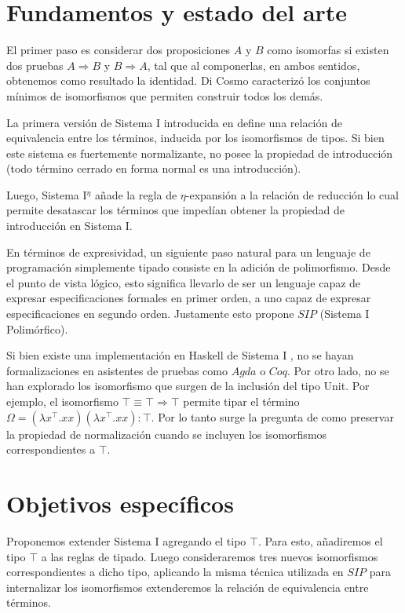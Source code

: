 \documentclass[a4paper,10pt]{article}
\begin{document}
\section{Fundamentos y estado del arte}

El primer paso es considerar dos proposiciones $A$ y $B$ como isomorfas si existen dos pruebas $A \Rightarrow B$ y $B \Rightarrow A$, tal que al componerlas, en ambos sentidos, obtenemos como resultado la identidad. Di Cosmo \cite{dicosmo} caracterizó los conjuntos mínimos de isomorfismos que permiten construir todos los demás.

La primera versión de Sistema I introducida en \cite{sistema-i} define una relación de equivalencia entre los términos, inducida por los isomorfismos de tipos. Si bien este sistema es fuertemente normalizante, no posee la propiedad de introducción (todo término cerrado  en forma normal es una introducción).

Luego, Sistema I$^\eta$ \cite{sistema-in} añade la regla de $\eta$-expansión a la relación de reducción lo cual permite desatascar los términos que impedían obtener la propiedad de introducción en Sistema I.

En términos de expresividad, un siguiente paso natural para un lenguaje de programación simplemente tipado consiste en la adición de polimorfismo. Desde el punto de vista lógico, esto significa llevarlo de ser un lenguaje capaz de expresar especificaciones formales en primer orden, a uno capaz de expresar especificaciones en segundo orden. Justamente esto propone $SIP$ \cite{sistema-ip} (Sistema I Polimórfico).

Si bien existe una implementación en Haskell de Sistema I \cite{lambda+}, no se hayan formalizaciones en asistentes de pruebas como $Agda$ o $Coq$. Por otro lado, no se han explorado los isomorfismo que surgen de la inclusión del tipo Unit. Por ejemplo, el isomorfismo $\top \equiv \top \Rightarrow \top$ permite tipar el término $\Omega = (\lambda x^\top.xx)(\lambda x^\top.xx) : \top$. Por lo tanto surge la pregunta de como preservar la propiedad de normalización cuando se incluyen los isomorfismos correspondientes a $\top$.

\section{Objetivos específicos}

Proponemos extender Sistema I agregando el tipo $\top$. Para esto, añadiremos el tipo $\top$ a las reglas de tipado. Luego consideraremos tres nuevos isomorfismos correspondientes a dicho tipo, aplicando la misma técnica utilizada en $SIP$ para internalizar los isomorfismos extenderemos la relación de equivalencia entre términos.
\end{document}
